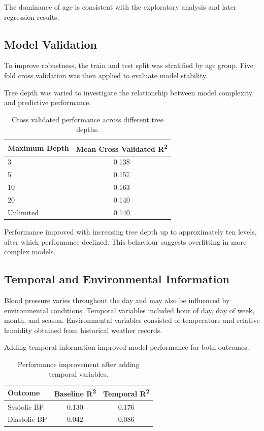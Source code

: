 \documentclass[12pt,a4paper]{article}
\begin{document}
The dominance of age is consistent with the exploratory analysis and later regression results.

\subsection{Model Validation}

To improve robustness, the train and test split was stratified by age group. Five fold cross validation was then applied to evaluate model stability.

Tree depth was varied to investigate the relationship between model complexity and predictive performance.

\begin{table}[H]
\centering
\caption{Cross validated performance across different tree depths.}
\label{tab:rf_depth}
\begin{tabular}{lc}
\toprule
Maximum Depth & Mean Cross Validated R\textsuperscript{2} \\
\midrule
3 & 0.138 \\
5 & 0.157 \\
10 & 0.163 \\
20 & 0.140 \\
Unlimited & 0.140 \\
\bottomrule
\end{tabular}
\end{table}

Performance improved with increasing tree depth up to approximately ten levels, after which performance declined. This behaviour suggests overfitting in more complex models.

\subsection{Temporal and Environmental Information}

Blood pressure varies throughout the day and may also be influenced by environmental conditions. Temporal variables included hour of day, day of week, month, and season. Environmental variables consisted of temperature and relative humidity obtained from historical weather records.

Adding temporal information improved model performance for both outcomes.

\begin{table}[H]
\centering
\caption{Performance improvement after adding temporal variables.}
\label{tab:temporal_results}
\begin{tabular}{lcc}
\toprule
Outcome & Baseline R\textsuperscript{2} & Temporal R\textsuperscript{2} \\
\midrule
Systolic BP & 0.130 & 0.176 \\
Diastolic BP & 0.042 & 0.086 \\
\bottomrule
\end{tabular}
\end{table}
\end{document}
